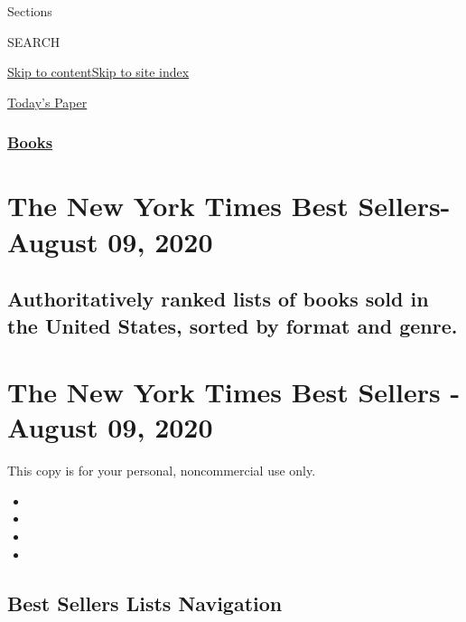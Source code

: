 Sections

SEARCH

\protect\hyperlink{site-content}{Skip to
content}\protect\hyperlink{site-index}{Skip to site index}

\href{https://myaccount.nytimes.com/auth/login?response_type=cookie\&client_id=vi}{}

\href{https://www.nytimes.com/section/todayspaper}{Today's Paper}

\hypertarget{books}{%
\subsubsection{\texorpdfstring{\href{/section/books/}{Books}}{Books}}\label{books}}

\hypertarget{the-new-york-times-best-sellers--august-09-2020}{%
\section{The New York Times Best Sellers- August 09,
2020}\label{the-new-york-times-best-sellers--august-09-2020}}

\hypertarget{authoritatively-ranked-lists-of-books-sold-in-the-united-states-sorted-by-format-and-genre}{%
\subsection{Authoritatively ranked lists of books sold in the United
States, sorted by format and
genre.}\label{authoritatively-ranked-lists-of-books-sold-in-the-united-states-sorted-by-format-and-genre}}

\hypertarget{the-new-york-times-best-sellers---august-09-2020}{%
\section{The New York Times Best Sellers - August 09,
2020}\label{the-new-york-times-best-sellers---august-09-2020}}

This copy is for your personal, noncommercial use only.

\begin{itemize}
\item
\item
\item
\item
\end{itemize}

\hypertarget{best-sellers-lists-navigation}{%
\subsection{Best Sellers Lists
Navigation}\label{best-sellers-lists-navigation}}

